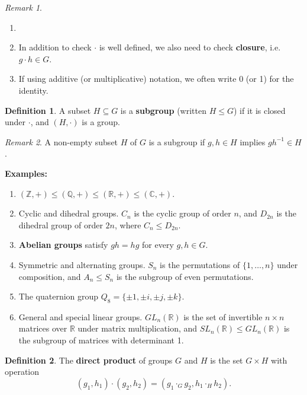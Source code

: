 \documentclass[12pt]{article}
\theoremstyle{definition}
\newtheorem{definition}{Definition}[section]
\theoremstyle{remark}
\newtheorem*{remark}{Remark}
\begin{document}
\begin{remark}
\begin{enumerate}[label = (\roman*)]
	\item[]
	\item In addition to check $\cdot$ is well defined, we also need to check \textbf{closure}, i.e. $g \cdot h \in G$.
	\item If using additive (or multiplicative) notation, we often write 0 (or 1) for the identity.
\end{enumerate}
\end{remark}

\begin{definition}
	A subset $H \subseteq G$ is a \textbf{subgroup} (written $H \leq G$) if it is closed under $\cdot$, and $(H, \cdot)$ is a group.
\end{definition}

\begin{remark}
	A non-empty subset $H$ of $G$ is a subgroup if $g, h \in H$ implies $gh^{-1} \in H$.
\end{remark}

\textbf{Examples:} 

\begin{enumerate}[label = (\roman*)]
	\item $(\mathbb{Z}, +) \leq (\mathbb{Q}, +) \leq (\mathbb{R}, +) \leq (\mathbb{C}, +)$.
	\item Cyclic and dihedral groups. $C_n$ is the cyclic group of order $n$, and $D_{2n}$ is the dihedral group of order $2n$, where $C_n \leq D_{2n}$.
	\item \textbf{Abelian groups} satisfy $gh = hg$ for every $g, h \in G$.
	\item Symmetric and alternating groups. $S_n$ is the permutations of $\{1, \ldots, n\}$ under composition, and $A_n \leq S_n$ is the subgroup of even permutations.
	\item The quaternion group $Q_8 = \{\pm 1, \pm i, \pm j, \pm k\}$.
	\item General and special linear groups. $GL_n(\mathbb{R})$ is the set of invertible $n \times n$ matrices over $\mathbb{R}$ under matrix multiplication, and $SL_n(\mathbb{R}) \leq GL_n(\mathbb{R})$ is the subgroup of matrices with determinant 1.
\end{enumerate}

\begin{definition}
	The \textbf{direct product} of groups $G$ and $H$ is the set $G \times H$ with operation
	\[
		(g_1, h_1) \cdot (g_2, h_2) = (g_1 \cdot_G g_2, h_1 \cdot_H h_2)
	.\]
\end{definition}
\end{document}
